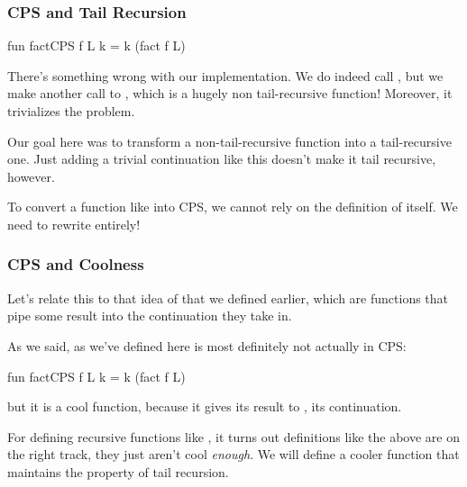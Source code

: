 \documentclass[aspectratio=169, handout]{beamer}
\begin{document}
\begin{frame}[fragile]
  \frametitle{CPS and Tail Recursion} 

  \begin{codeblock}
    fun factCPS f L k = k (fact f L)
  \end{codeblock}

  \pause
  \vspace{\fill}


  \pause
  \vspace{\fill}

  There's something wrong with our implementation. We do indeed call 
  , but we make another call to , which is a hugely
  non tail-recursive function! Moreover, it trivializes the problem.

  \pause
  \vspace{\fill}

  Our goal here was to transform a non-tail-recursive function into 
  a tail-recursive one. Just adding a trivial continuation
  like this doesn't make it tail recursive, however.

  \pause
  \vspace{\fill}

  To convert a function like  into CPS, we cannot rely on the
  definition of  itself. We need to rewrite  entirely!
\end{frame}

\begin{frame}[fragile]
  \frametitle{CPS and Coolness} 

  Let's relate this to that idea of  that we defined earlier,
  which are functions that pipe some result into the continuation they take in.

  \pause
  \vspace{\fill}

  As we said,  as we've defined here is most definitely not 
  actually in CPS: 
  \begin{codeblock}
    fun factCPS f L k = k (fact f L)
  \end{codeblock}
  but it is a cool function, because it gives its result to , its 
  continuation.

  \pause
  \vspace{\fill}


  \pause
  \vspace{\fill}

  For defining recursive functions like , it turns out definitions
  like the above are on the right track, they just aren't cool \textit{enough}.
  We will define a cooler function that maintains the property of tail recursion.
\end{frame}
\end{document}
